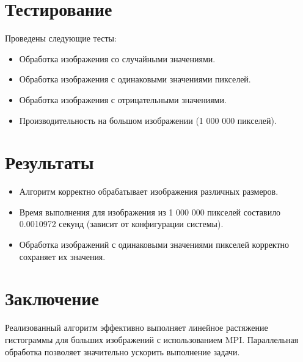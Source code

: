 \documentclass[12pt]{article}
\begin{document}
\section*{Тестирование}
Проведены следующие тесты:
\begin{itemize}
    \item Обработка изображения со случайными значениями.
    \item Обработка изображения с одинаковыми значениями пикселей.
    \item Обработка изображения с отрицательными значениями.
    \item Производительность на большом изображении (1 000 000 пикселей).
\end{itemize}

\section*{Результаты}
\begin{itemize}
    \item Алгоритм корректно обрабатывает изображения различных размеров.
    \item Время выполнения для изображения из 1 000 000 пикселей составило 0.0010972 секунд (зависит от конфигурации системы).
    \item Обработка изображений с одинаковыми значениями пикселей корректно сохраняет их значения.
\end{itemize}

\section*{Заключение}
Реализованный алгоритм эффективно выполняет линейное растяжение гистограммы для больших изображений с использованием MPI. Параллельная обработка позволяет значительно ускорить выполнение задачи.
\end{document}
